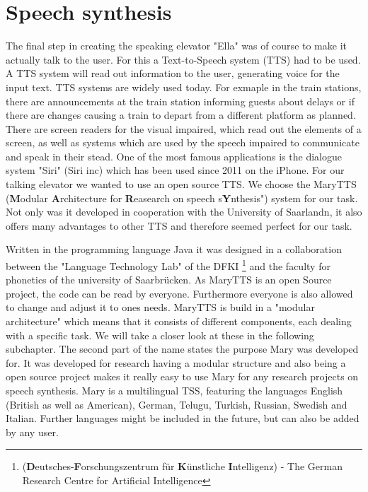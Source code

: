 \documentclass[a4paper, 12pt]{article}
\begin{document}
\newpage        
\section{Speech synthesis}
\label{sec:Speech_Synthesis}
The final step in creating the speaking elevator "Ella" was of course to make it actually talk to the user.
For this a Text-to-Speech system (TTS) had to be used. A TTS system will read out information to the user, generating voice for the input text. TTS systems are widely used today. 
For exmaple in the train stations, there are announcements at the train station informing guests about delays or if there are changes causing a train to depart from a different platform as planned.
There are screen readers for the visual impaired, which read out the elements of a screen, as well as systems which are used by the speech impaired to communicate and speak in their stead.
One of the most famous applications is the dialogue system "Siri" (Siri inc) which has been used since 2011 on the iPhone. \newline \newline
For our talking elevator we wanted to use an open source TTS. 
We choose the MaryTTS (\textbf{M}odular \textbf{A}rchitecture for \textbf{R}easearch on speech s\textbf{Y}nthesis") system for our task.
Not only was it developed in cooperation with the University of Saarlandn, it also offers many advantages to other TTS and therefore seemed perfect for our task.\newline

Written in the programming language Java it was designed in a collaboration between the  "Language Technology Lab" of the DFKI \footnote{(\textbf{D}eutsches-\textbf{F}orschungszentrum für \textbf{K}ünstliche \textbf{I}ntelligenz) - The German Research Centre for Artificial Intelligence} and the faculty for phonetics of the university of Saarbrücken.
As MaryTTS is an open Source project, the code can be read by everyone. Furthermore everyone is also allowed to change and adjust it to ones needs.\newline \newline
MaryTTS is build in a "modular architecture" which means that it consists of different components, each dealing with a specific task. We will take a closer look at these in the following subchapter.
The second part of the name states the purpose Mary was developed for.
It was developed for research having a modular structure and also being a open source project makes it really easy to use Mary for any research projects on speech synthesis. \newline \newline
Mary is a multilingual TSS, featuring the languages English (British as well as American), German, Telugu, Turkish, Russian, Swedish and Italian. 
Further languages might be included in the future, but can also be added by any user. \newline \newline
\end{document}
